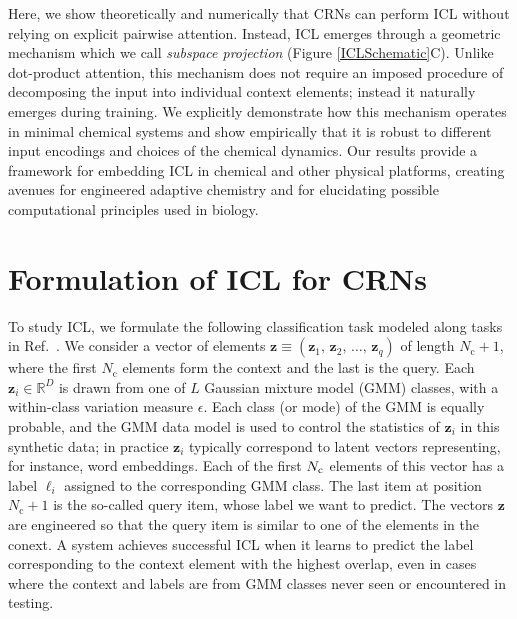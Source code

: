 \documentclass[%
reprint,
superscriptaddress,
amsmath,amssymb,
aps,
]{revtex4-2}
\newcommand{\bz}{\mathbf{z}}       %
\newcommand{\bl}{\boldsymbol{\ell}}       %
\begin{document}
	
	Here, we show theoretically and numerically that CRNs can perform ICL without relying on explicit pairwise attention. Instead, ICL emerges through a geometric mechanism which we call \emph{subspace projection} (Figure \ref{ICLSchematic}C). Unlike dot-product attention, this mechanism does not require an imposed procedure of decomposing the input into individual context elements; instead it naturally emerges during training.  We explicitly demonstrate how this mechanism operates in minimal chemical systems and show empirically that it is robust to different input encodings and choices of the chemical dynamics. Our results provide a framework for embedding ICL in chemical and other physical platforms, creating avenues for engineered adaptive chemistry and for elucidating possible computational principles used in biology.
	
	
	\section{Formulation of ICL for CRNs}
	
	To study ICL, we formulate the following classification task modeled along tasks in Ref.~. We consider a vector of elements $\bz \equiv \left(\bz_1,\, \bz_2,\, \ldots,\, \bz_{q}\right)$ of length $N_\text{c}+1$, where the first $N_\text{c}$ elements form the context and the last is the query.   Each $\bz_i\in\mathbb{R}^D$ is drawn from one of $L$ Gaussian mixture model (GMM) classes, with a within-class variation measure $\epsilon$.  Each class (or mode) of the GMM is equally probable, and the GMM data model is used to control the statistics of $\bz_i$ in this synthetic data; in practice $\bz_i$ typically correspond to latent vectors representing, for instance, word embeddings.  Each of the first $N_{\rm c}$ elements of this vector has a label $\ell_i$ assigned to the corresponding GMM class.  The last item at position $N_\text{c}+1$ is the so-called query item, whose label we want to predict. The vectors $\bz$ are engineered so that the query item is similar to one of the elements in the  conext. A system achieves successful ICL when it learns to predict the label corresponding to the context element with the highest overlap, even in cases where the context and labels are from GMM classes never seen or encountered in testing. 
	
	
	
\end{document}
